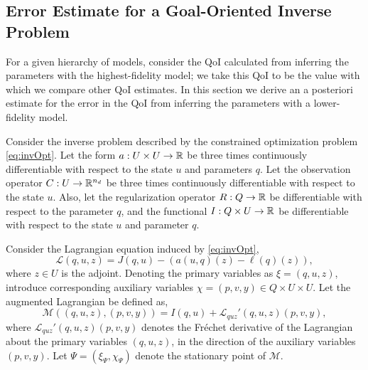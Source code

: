 \subsection[Error Estimate for a Goal-Oriented Inverse Problem]{Error Estimate for a Goal-Oriented Inverse Problem}  \label{sec:deriv}
%
For a given hierarchy of models, consider the QoI calculated from inferring the parameters with the highest-fidelity model; we take this QoI to be the value with which we compare other QoI estimates. In this section we derive an a posteriori estimate for the error in the QoI from inferring the parameters with a lower-fidelity model.
%
\begin{theorem}
\label{thm:error_estimate}
Consider the inverse problem described by the constrained optimization problem \cref{eq:invOpt}. Let the form $a:U \times U \to {\mathbb{R}}$ be three times continuously differentiable with respect to the state $u$ and parameters $q$. Let the observation operator $C:U\to{\mathbb{R}}^{n_d}$ be three times continuously differentiable with respect to the state $u$. Also, let the regularization operator $R:Q\to{\mathbb{R}}$ be differentiable with respect to the parameter $q$, and the functional $I:Q\times U\to{\mathbb{R}}$ be differentiable with respect to the state $u$ and parameter $q$.

Consider the Lagrangian equation induced by \cref{eq:invOpt},
%
\begin{equation}
\label{eq:InvsOpt_lag}
\mathcal{L}(q,u,z)= J(q,u)-(a(u,q)(z)-\ell(q)(z)),
\end{equation}
%
where $z\in U$ is the adjoint. Denoting the primary variables as $\xi=(q,u,z)$, introduce corresponding auxiliary variables $\chi=(p,v,y)\in Q\times U\times U$. Let the augmented Lagrangian be defined as,
%
\begin{equation}
\label{eq:InvsOpt_auglag}
\mathcal{M}((q,u,z),(p,v,y)) = I(q,u) + \mathcal{L}_{quz}'(q,u,z)(p,v,y),
\end{equation}
%
where $\mathcal{L}_{quz}'(q,u,z)(p,v,y)$ denotes the Fr\'{e}chet derivative of the Lagrangian about the primary variables $(q,u,z)$, in the direction of the auxiliary variables $(p,v,y)$. Let $\Psi = (\xi_\Psi,\chi_\Psi)$ denote the stationary point of $\mathcal{M}$.


\end{theorem}
